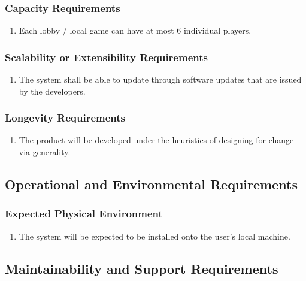 \documentclass[12pt, titlepage]{article}
\begin{document}
    \subsubsection{Capacity Requirements}
    \begin{enumerate}[label=PR\arabic*.]
        \item Each lobby / local game can have at most 6 individual players. 
    \end{enumerate}
    \subsubsection{Scalability or Extensibility Requirements}
    \begin{enumerate}[label=PR\arabic*.]
        \item The system shall be able to update through software updates that are issued by the developers.
    \end{enumerate}
    \subsubsection{Longevity Requirements}
    \label{ssub:longevity_requirements}
    \begin{enumerate}[label=PR\arabic*.]
        \item The product will be developed under the heuristics of designing for change via generality.  
    \end{enumerate}
\subsection{Operational and Environmental Requirements}
    \subsubsection{Expected Physical Environment}
    \label{ssub:expected_physical_environment}
    \begin{enumerate}[label=OE\arabic*.]
        \item The system will be expected to be installed onto the user's local machine.
    \end{enumerate}
    
\subsection{Maintainability and Support Requirements}
    
\end{document}
